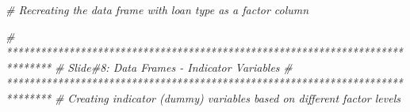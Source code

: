 \documentclass[
]{article}
\newenvironment{Shaded}{\begin{snugshade}}{\end{snugshade}}
\newcommand{\CommentTok}[1]{\textcolor[rgb]{0.56,0.35,0.01}{\textit{#1}}}
\begin{document}
\begin{Shaded}
\begin{Highlighting}[]
\CommentTok{\# Recreating the data frame with loan type as a factor column}


\CommentTok{\# ******************************************************************************}
\CommentTok{\# Slide\#8: Data Frames {-} Indicator Variables}
\CommentTok{\# ******************************************************************************}
\CommentTok{\# Creating indicator (dummy) variables based on different factor levels}
\end{Highlighting}
\end{Shaded}
\end{document}
